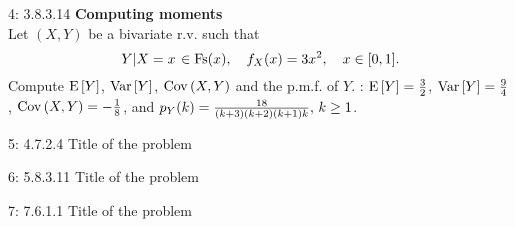 \documentclass[a4paper,twoside=false,abstract=false,numbers=noenddot,
titlepage=false,headings=small,parskip=half,version=last]{scrartcl}
\begin{document}
\begin{exercise}{4: 3.8.3.14} \textbf{Computing moments} \\
    Let $(X,Y)$ be a bivariate r.v. such that
    \begin{equation}
        \left. Y \middle\vert X=x \right. \in \text{Fs}(x),\quad
        f_X(x)=3x^2,\quad
        x\in [0, 1].
    \end{equation}
    Compute ${\rm E}\,[Y]$, ${\rm Var}\,[Y]$, ${\rm Cov}\,(X, Y)$ and the p.m.f.
    of $Y$.
    \Answer:
    ${{\rm E}\,[Y]=\frac{3}{2}}$,
    ${{\rm Var}\,[Y]=\frac{9}{4}}$,
    ${{\rm Cov}\,(X,Y)=-\frac{1}{8}}$, and
    $p_{Y} (k) = \frac{18}{(k+3)(k+2)(k+1)k},\, k \ge 1$.

\end{exercise}
\begin{solution}
\end{solution}
\pagebreak

\begin{exercise}{5: 4.7.2.4} Title of the problem \\
\end{exercise}
\begin{solution}
\end{solution}
\pagebreak

\begin{exercise}{6: 5.8.3.11} Title of the problem \\
\end{exercise}
\begin{solution}
\end{solution}
\pagebreak

\begin{exercise}{7: 7.6.1.1} Title of the problem \\
\end{exercise}
\begin{solution}
\end{solution}
\pagebreak

\end{document}
